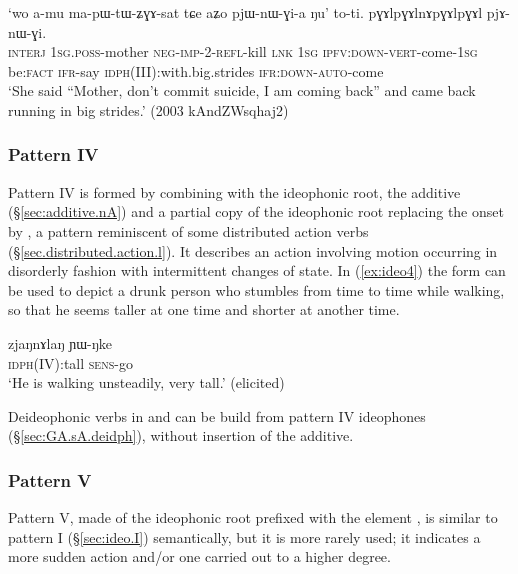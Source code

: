 \begin{exe} 
\ex \label{ex:pGAlnApGAl}
\gll `wo a-mu ma-pɯ-tɯ-ʑɣɤ-sat tɕe aʑo pjɯ-nɯ-ɣi-a ŋu' to-ti. pɣɤlpɣɤlnɤpɣɤlpɣɤl pjɤ-nɯ-ɣi. \\
\textsc{interj} \textsc{1sg}.\textsc{poss}-mother \textsc{neg}-\textsc{imp}-2-\textsc{refl}-kill \textsc{lnk} \textsc{1sg} \textsc{ipfv}:\textsc{down}-\textsc{vert}-come-\textsc{1sg} be:\textsc{fact} \textsc{ifr}-say \textsc{idph}(III):with.big.strides \textsc{ifr}:\textsc{down}-\textsc{auto}-come \\
\glt `She said ``Mother, don't commit suicide, I am coming back'' and came back running in big strides.' (2003 kAndZWsqhaj2)
\end{exe} 
 
 
   \subsubsection{Pattern IV} \label{sec:ideo.IV}
Pattern IV is formed by combining with the ideophonic root, the additive  (§\ref{sec:additive.nA}) and a partial copy of the ideophonic root replacing the onset by , a pattern reminiscent of some distributed action verbs (§\ref{sec.distributed.action.l}). It describes an action involving motion  occurring in disorderly fashion with intermittent changes of state. In (\ref{ex:ideo4}) the form   can be used to depict a drunk person who stumbles from time to time while walking, so that he seems taller at one time and shorter at another time.
 
  \begin{exe} 
\ex  \label{ex:ideo4}
\gll  zjaŋnɤlaŋ ɲɯ-ŋke   \\
     \textsc{idph}(IV):tall \textsc{sens}-go  \\
\glt `He is walking unsteadily, very tall.'   (elicited)
 \end{exe} 
 
Deideophonic verbs in  and  can be build from pattern IV ideophones (§\ref{sec:GA.sA.deidph}), without insertion of the additive.

\subsubsection{Pattern V} \label{sec:ideo.V}
 Pattern V, made of the ideophonic root prefixed with the element , is similar to pattern I (§\ref{sec:ideo.I}) semantically, but it is more rarely used; it indicates a more sudden action and/or one carried out to a higher degree.
 
